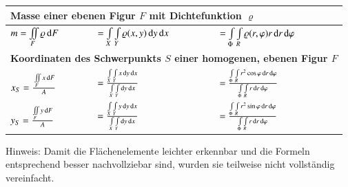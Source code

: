 {\begin{tabular}{|l|l|l|}
        \multicolumn{3}{|l|}{\bf{Masse einer ebenen Figur $F$ mit Dichtefunktion $\varrho$}} \\\hline
        \bigstrut[tb]$ m = \iint\limits_{F} \varrho \mathop{} \! \mathrm{d} F $ & 
        $ = \int\limits_{X}\int\limits_{Y} \varrho (x, y) \mathop{} \! \mathrm{d} y \mathop{} \! \mathrm{d} x $ &
        $ = \int\limits_{\Phi}\int\limits_{R} \varrho (r, \varphi) r \mathop{} \! \mathrm{d} r \mathop{} \! \mathrm{d} \varphi $ \\\hline

        \multicolumn{3}{|l|}{\bf{Koordinaten des Schwerpunkts $S$ einer homogenen, ebenen Figur $F$}} \\\hline
        \bigstrut[tb]$ x_{S} = \frac{\strut \iint\limits_{F} x \mathop{} \! \mathrm{d} F}{A} $ & 
        $ = \frac{\int\limits_{X}\int\limits_{Y} x \mathop{} \! \mathrm{d} y \mathop{} \! \mathrm{d} x}{\int\limits_{X}\int\limits_{Y} \mathop{} \! \mathrm{d} y \mathop{} \! \mathrm{d} x} $ &
        $ = \frac{\int\limits_{\Phi}\int\limits_{R} r^2 \cos \varphi \mathop{} \! \mathrm{d} r \mathop{} \! \mathrm{d} \varphi}{\int\limits_{\Phi}\int\limits_{R} r \mathop{} \! \mathrm{d} r \mathop{} \! \mathrm{d} \varphi} $ \\
        \bigstrut[tb]$ y_{S} = \frac{\iint\limits_{F} y \mathop{} \! \mathrm{d} F}{A} $ & 
        $ = \frac{\int\limits_{X}\int\limits_{Y} y \mathop{} \! \mathrm{d} y \mathop{} \! \mathrm{d} x}{\int\limits_{X}\int\limits_{Y} \mathop{} \! \mathrm{d} y \mathop{} \! \mathrm{d} x} $ &
        $ = \frac{\int\limits_{\Phi}\int\limits_{R} r^2 \sin \varphi \mathop{} \! \mathrm{d} r \mathop{} \! \mathrm{d} \varphi}{\int\limits_{\Phi}\int\limits_{R} r \mathop{} \! \mathrm{d} r \mathop{} \! \mathrm{d} \varphi} $ \\\hline
    \end{tabular}
}

\smallskip
Hinweis: Damit die Flächenelemente leichter erkennbar und die Formeln entsprechend besser nachvollziebar sind, wurden sie teilweise nicht vollständig vereinfacht.


